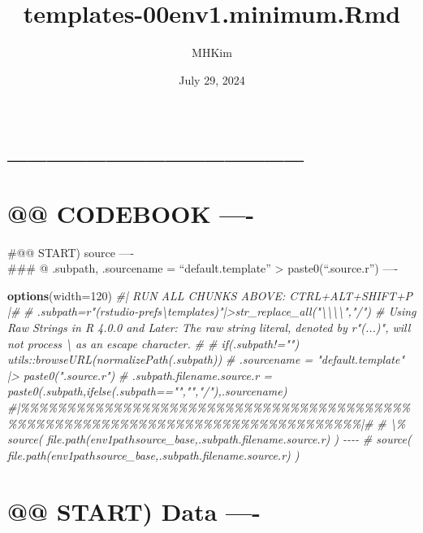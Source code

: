 \documentclass[
]{article}
\title{templates-00env1.minimum.Rmd}
\author{MHKim}
\date{July 29, 2024}
\newenvironment{Shaded}{\begin{snugshade}}{\end{snugshade}}
\newcommand{\AttributeTok}[1]{\textcolor[rgb]{0.13,0.29,0.53}{#1}}
\newcommand{\CommentTok}[1]{\textcolor[rgb]{0.56,0.35,0.01}{\textit{#1}}}
\newcommand{\DecValTok}[1]{\textcolor[rgb]{0.00,0.00,0.81}{#1}}
\newcommand{\FunctionTok}[1]{\textcolor[rgb]{0.13,0.29,0.53}{\textbf{#1}}}
\newcommand{\NormalTok}[1]{#1}
\begin{document}
\maketitle

{
\setcounter{tocdepth}{6}
\tableofcontents
}
\hypertarget{section}{%
\section{\_\_\_\_\_\_\_\_\_\_\_\_\_\_\_}\label{section}}

\hypertarget{codebook--}{%
\section{@@ CODEBOOK ----}\label{codebook--}}

\#@@ START) source ----\\
\#\#\# @ .subpath, .sourcename = ``default.template''
\textbar\textgreater{} paste0(``.source.r'') ----

\begin{Shaded}
\begin{Highlighting}[]
\FunctionTok{options}\NormalTok{(}\AttributeTok{width=}\DecValTok{120}\NormalTok{)}
\CommentTok{\#| RUN ALL CHUNKS ABOVE: CTRL+ALT+SHIFT+P |\#}
\CommentTok{\# .subpath=r"(rstudio{-}prefs\textbackslash{}templates)"|\textgreater{}str\_replace\_all("\textbackslash{}\textbackslash{}\textbackslash{}\textbackslash{}","/")  \# Using Raw Strings in R 4.0.0 and Later: The raw string literal, denoted by r"(...)", will not process \textbackslash{} as an escape character.}
\CommentTok{\# \# if(.subpath!="") utils::browseURL(normalizePath(.subpath))}
\CommentTok{\# .sourcename = "default.template" |\textgreater{} paste0(".source.r")}
\CommentTok{\# .subpath.filename.source.r = paste0(.subpath,ifelse(.subpath=="","","/"),.sourcename)}
\CommentTok{\#|\%\%\%\%\%\%\%\%\%\%\%\%\%\%\%\%\%\%\%\%\%\%\%\%\%\%\%\%\%\%\%\%\%\%\%\%\%\%\%\%\%\%\%\%\%\%\%\%\%\%\%\%\%\%\%\%\%\%\%\%\%\%\%\%\%\%\%\%\%\%\%\%\%\%\%\%\%\%\%\%|\#  }
\CommentTok{\# \textbackslash{}\% source( file.path(env1$path$source\_base,.subpath.filename.source.r) ) {-}{-}{-}{-}  }
\CommentTok{\# source( file.path(env1$path$source\_base,.subpath.filename.source.r) )}
\end{Highlighting}
\end{Shaded}

\hypertarget{start-data--}{%
\section{@@ START) Data ----}\label{start-data--}}
\end{document}
